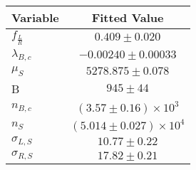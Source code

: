 \begin{tabular}[t]{lc}
\hline
Variable &Fitted Value\\
\hline\hline
$f_{\frac{L}{R}}$&$0.409\pm0.020$\\
\hline
$\lambda_{B,c}$&$-0.00240\pm0.00033$\\
\hline
$\mu_S$&$5278.875\pm0.078$\\
\hline
B&$945\pm44$\\
\hline
$n_{B,c}$&$(3.57\pm0.16)\times 10^3$\\
\hline
$n_S$&$(5.014\pm0.027)\times 10^4$\\
\hline
$\sigma_{L, S}$&$10.77\pm0.22$\\
\hline
$\sigma_{R, S}$&$17.82\pm0.21$\\
\hline
\end{tabular}